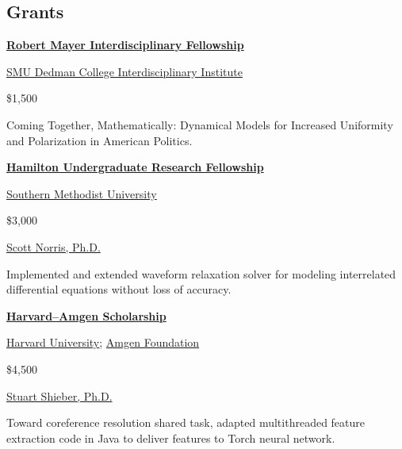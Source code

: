 \documentclass[margin, 10pt]{res} %
\newcommand{\SMU}{\href{https://www.smu.edu/}{Southern Methodist University}}
\begin{document}
\begin{resume}

\section{Grants}

\textbf{\href{http://www.smu.edu/Dedman/DCII/Programs/Mayer}{Robert Mayer Interdisciplinary Fellowship}}
\begin{description}[nosep, labelindent=1em]
\item[Awarding body:] \href{http://www.smu.edu/Dedman/DCII}{SMU Dedman College Interdisciplinary Institute}
\item[Amount:] \$1,500
\item Coming Together, Mathematically: Dynamical Models for Increased Uniformity and Polarization in American Politics.
\end{description}

\begin{samepage}
\textbf{\href{http://www.smu.edu/Dedman/DCII/Programs/Hamilton}{Hamilton Undergraduate Research Fellowship}}
\begin{description}[nosep, labelindent=1em]
\item[Awarding body:] \SMU
\item[Amount:] \$3,000
\item[Supervisor:] \href{http://faculty.smu.edu/snorris/}{Scott Norris, Ph.D.}
\item Implemented and extended waveform relaxation solver for modeling interrelated differential equations without loss of accuracy.
\end{description}
\end{samepage}


\begin{samepage}
\textbf{\href{https://uraf.harvard.edu/amgen-scholars}{Harvard--Amgen Scholarship}}
\begin{description}[nosep, labelindent=1em]
\item[Awarding body:] \href{https://uraf.harvard.edu/home}{Harvard University}; \href{http://www.amgen.com/responsibility/amgen-foundation/}{Amgen Foundation}
\item[Amount:] \$4,500
\item[Supervisor:] \href{http://www.eecs.harvard.edu/shieber/}{Stuart Shieber, Ph.D.}
\item Toward coreference resolution shared task, adapted multithreaded feature extraction code in Java to deliver features to Torch neural network.
\end{description}
\end{samepage}



\end{resume}
\end{document}
